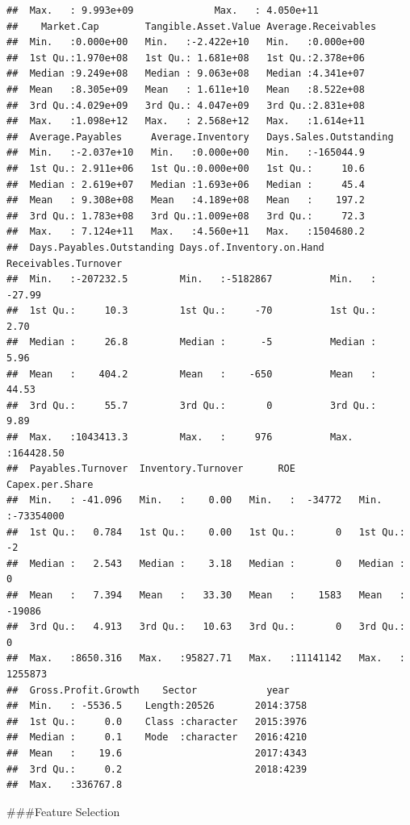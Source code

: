 \documentclass[11pt,]{article}
\begin{document}
\begin{verbatim}
##  Max.   : 9.993e+09              Max.   : 4.050e+11            
##    Market.Cap        Tangible.Asset.Value Average.Receivables
##  Min.   :0.000e+00   Min.   :-2.422e+10   Min.   :0.000e+00  
##  1st Qu.:1.970e+08   1st Qu.: 1.681e+08   1st Qu.:2.378e+06  
##  Median :9.249e+08   Median : 9.063e+08   Median :4.341e+07  
##  Mean   :8.305e+09   Mean   : 1.611e+10   Mean   :8.522e+08  
##  3rd Qu.:4.029e+09   3rd Qu.: 4.047e+09   3rd Qu.:2.831e+08  
##  Max.   :1.098e+12   Max.   : 2.568e+12   Max.   :1.614e+11  
##  Average.Payables     Average.Inventory   Days.Sales.Outstanding
##  Min.   :-2.037e+10   Min.   :0.000e+00   Min.   :-165044.9     
##  1st Qu.: 2.911e+06   1st Qu.:0.000e+00   1st Qu.:     10.6     
##  Median : 2.619e+07   Median :1.693e+06   Median :     45.4     
##  Mean   : 9.308e+08   Mean   :4.189e+08   Mean   :    197.2     
##  3rd Qu.: 1.783e+08   3rd Qu.:1.009e+08   3rd Qu.:     72.3     
##  Max.   : 7.124e+11   Max.   :4.560e+11   Max.   :1504680.2     
##  Days.Payables.Outstanding Days.of.Inventory.on.Hand Receivables.Turnover
##  Min.   :-207232.5         Min.   :-5182867          Min.   :   -27.99   
##  1st Qu.:     10.3         1st Qu.:     -70          1st Qu.:     2.70   
##  Median :     26.8         Median :      -5          Median :     5.96   
##  Mean   :    404.2         Mean   :    -650          Mean   :    44.53   
##  3rd Qu.:     55.7         3rd Qu.:       0          3rd Qu.:     9.89   
##  Max.   :1043413.3         Max.   :     976          Max.   :164428.50   
##  Payables.Turnover  Inventory.Turnover      ROE           Capex.per.Share    
##  Min.   : -41.096   Min.   :    0.00   Min.   :  -34772   Min.   :-73354000  
##  1st Qu.:   0.784   1st Qu.:    0.00   1st Qu.:       0   1st Qu.:       -2  
##  Median :   2.543   Median :    3.18   Median :       0   Median :        0  
##  Mean   :   7.394   Mean   :   33.30   Mean   :    1583   Mean   :   -19086  
##  3rd Qu.:   4.913   3rd Qu.:   10.63   3rd Qu.:       0   3rd Qu.:        0  
##  Max.   :8650.316   Max.   :95827.71   Max.   :11141142   Max.   :  1255873  
##  Gross.Profit.Growth    Sector            year     
##  Min.   : -5536.5    Length:20526       2014:3758  
##  1st Qu.:     0.0    Class :character   2015:3976  
##  Median :     0.1    Mode  :character   2016:4210  
##  Mean   :    19.6                       2017:4343  
##  3rd Qu.:     0.2                       2018:4239  
##  Max.   :336767.8
\end{verbatim}

\#\#\#Feature Selection
\end{document}
